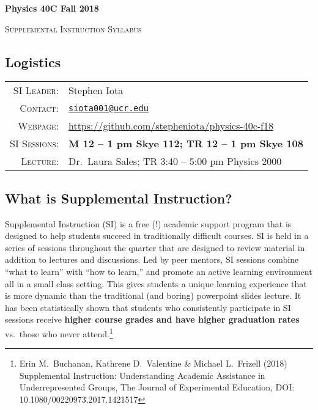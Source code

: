 \documentclass[11pt]{article}
\begin{document}
\begin{center}
\huge\textbf{{Physics 40C Fall 2018}}

\Large{\textsc{Supplemental Instruction Syllabus}} 


\end{center}





\subsection*{Logistics}

\begin{tabular}{rl}

\textsc{SI Leader}:
&
Stephen Iota
\\
\textsc{Contact}:
&
\href{mailto:siota001@ucr.edu}{\texttt{siota001@ucr.edu}}
\\
\textsc{Webpage}:
&
\url{https://github.com/stepheniota/physics-40c-f18}
\\
\textsc{SI Sessions}:
&
\textbf{M 12 -- 1 pm Skye 112; TR 12 -- 1 pm Skye 108}
\\
\textsc{Lecture:}
&
Dr.~Laura Sales; TR 3:40 -- 5:00 pm Physics 2000
\\
\end{tabular}







\subsection*{What is Supplemental Instruction?}

Supplemental Instruction \textsc{(SI)} is a free (!) academic support program that is designed to help students succeed in traditionally difficult courses. 
SI is held in a series of sessions throughout the quarter that are designed to review material in addition to lectures and discussions. 
Led by peer mentors, SI sessions combine ``what to learn'' with ``how to learn,''  and promote an active learning environment all in a small class setting.  
This gives students a unique learning experience that is more dynamic than the traditional (and boring) powerpoint slides lecture. 
It has been statistically shown that students who consistently participate in SI sessions receive \textbf{higher course grades and have higher graduation rates} vs.~those who never attend.\footnote{Erin M.~Buchanan, Kathrene D.~Valentine \& Michael L.~Frizell (2018) Supplemental Instruction: Understanding Academic Assistance in Underrepresented Groups, The Journal of Experimental Education, DOI: 10.1080/00220973.2017.1421517}
\end{document}
